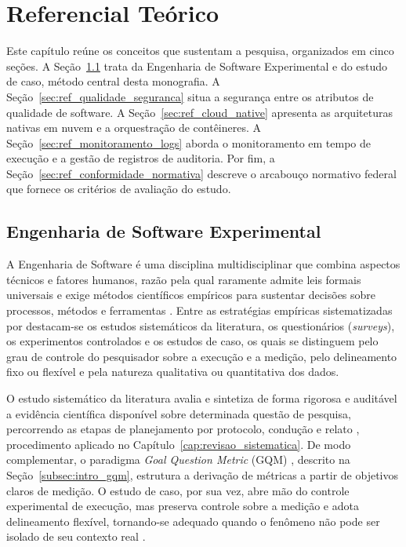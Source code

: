 \chapter{Referencial Teórico}
\label{cap:referencial_teorico}

Este capítulo reúne os conceitos que sustentam a pesquisa, organizados em cinco seções. A Seção~\ref{sec:ref_eng_software_experimental} trata da Engenharia de Software Experimental e do estudo de caso, método central desta monografia. A Seção~\ref{sec:ref_qualidade_seguranca} situa a segurança entre os atributos de qualidade de software. A Seção~\ref{sec:ref_cloud_native} apresenta as arquiteturas nativas em nuvem e a orquestração de contêineres. A Seção~\ref{sec:ref_monitoramento_logs} aborda o monitoramento em tempo de execução e a gestão de registros de auditoria. Por fim, a Seção~\ref{sec:ref_conformidade_normativa} descreve o arcabouço normativo federal que fornece os critérios de avaliação do estudo.

\section{Engenharia de Software Experimental}
\label{sec:ref_eng_software_experimental}




A Engenharia de Software é uma disciplina multidisciplinar que combina aspectos técnicos e fatores humanos, razão pela qual raramente admite leis formais universais e exige métodos científicos empíricos para sustentar decisões sobre processos, métodos e ferramentas \cite{wohlin2024}. Entre as estratégias empíricas sistematizadas por  destacam-se os estudos sistemáticos da literatura, os questionários (\textit{surveys}), os experimentos controlados e os estudos de caso, os quais se distinguem pelo grau de controle do pesquisador sobre a execução e a medição, pelo delineamento fixo ou flexível e pela natureza qualitativa ou quantitativa dos dados.

O estudo sistemático da literatura avalia e sintetiza de forma rigorosa e auditável a evidência científica disponível sobre determinada questão de pesquisa, percorrendo as etapas de planejamento por protocolo, condução e relato \cite{kitchenham2007}, procedimento aplicado no Capítulo~\ref{cap:revisao_sistematica}. De modo complementar, o paradigma \textit{Goal Question Metric} (GQM) \cite{basili1994}, descrito na Seção~\ref{subsec:intro_gqm}, estrutura a derivação de métricas a partir de objetivos claros de medição. O estudo de caso, por sua vez, abre mão do controle experimental de execução, mas preserva controle sobre a medição e adota delineamento flexível, tornando-se adequado quando o fenômeno não pode ser isolado de seu contexto real \cite{wohlin2024,runeson2009}.

